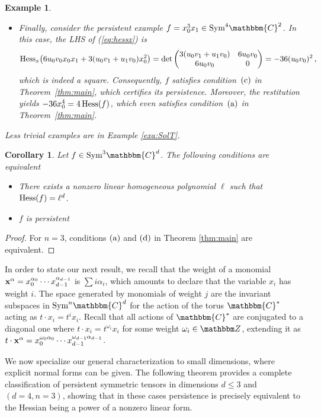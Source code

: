 \documentclass[aps,floatfix,groupedaddress,superscriptaddress,longbibliography,footinbib,notitlepage,showpacs]{revtex4-1}
\def\Hess{{\rm Hess}}
\newtheorem{corollary}[theorem]{Corollary}
\newtheorem{example}[theorem]{Example}
\begin{document}
\begin{example}
\begin{itemize}
\item[(iii)] Finally, consider the persistent example $f=x_0^3x_1\in\mathrm{Sym}^4\mathbbm{C}^2$. In this case, the LHS of (\ref{eq:hessx}) is
\[
\Hess_x\big(6u_0v_0x_0x_1+3(u_0v_1+u_1v_0)x_0^2\big)=\det\begin{pmatrix}3(u_0v_1+u_1v_0)&6u_0v_0\\
6u_0v_0&0\end{pmatrix}=-36(u_0v_0)^2\,,
\]
which is indeed a square. Consequently, $f$ satisfies condition~$(\textnormal{c})$ in Theorem~\ref{thm:main}, 
which certifies its persistence. Moreover, the restitution yields $-36x_0^4=4\,\Hess(f)$, which even satisfies condition~$(\textnormal{a})$ in Theorem~\ref{thm:main}.
\end{itemize}
Less trivial examples are in Example \ref{exa:SolT}.
\end{example}

\begin{corollary}\label{coro:n=3}
Let $f\in\text{Sym}^3\mathbbm{C}^d$.
The following conditions are equivalent
\begin{itemize}
\item[(a)] There exists a nonzero linear homogeneous polynomial $\ell$ such that $\Hess(f)=\ell^{d}$.
\item
[(b)] $f$ is persistent
\end{itemize}
\end{corollary}
\begin{proof}
For $n=3$, conditions $(\textnormal{a})$ and $(\textnormal{d})$ in Theorem \ref{thm:main} are equivalent.
\end{proof}

In order to state our next result, we recall that the weight of a monomial
${\bf{x}}^{\alpha}=x_0^{\alpha_0}\cdots x_{d-1}^{\alpha_{d-1}}$ is $\sum i\alpha_i$, which amounts to declare that the variable $x_i$ has weight $i$.
The space generated by monomials of weight $j$ are the invariant subspaces in $\text{Sym}^n\mathbbm{C}^d$ for the action of the torus $\mathbbm{C}^*$ acting as $t\cdot x_i=t^ix_i$. Recall that all actions of $\mathbbm{C}^*$ are conjugated to a diagonal one where $t\cdot x_i=t^{\omega_i}x_i$ for some weight $\omega_i\in{\mathbbm Z}$, extending it as $t\cdot {\bf{x}}^{\alpha}=x_0^{\omega_0\alpha_0}\cdots x_{d-1}^{\omega_{d-1}\alpha_{d-1}} $.

We now specialize our general characterization to small dimensions, where explicit normal forms can be given. 
The following theorem provides a complete classification of persistent symmetric tensors in dimensions $d\leq 3$ and $(d=4, n=3)$, showing that in these cases persistence is precisely equivalent to the Hessian being a power of a nonzero linear form.
\end{document}
